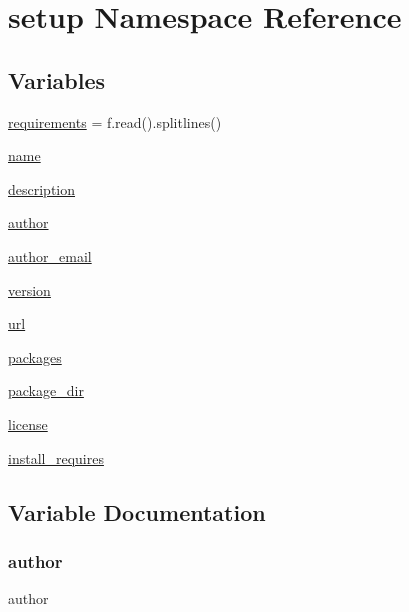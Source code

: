 \hypertarget{namespacesetup}{}\section{setup Namespace Reference}
\label{namespacesetup}
\subsection*{Variables}
\begin{DoxyCompactItemize}
\item 
\hyperlink{namespacesetup_aae5f59f06402b79899f58170ca7c3abb}{requirements} = f.\+read().splitlines()
\item 
\hyperlink{namespacesetup_ab74e6bf80237ddc4109968cedc58c151}{name}
\item 
\hyperlink{namespacesetup_a2661f439a4a94ffdcd5e47ae1da0bb1d}{description}
\item 
\hyperlink{namespacesetup_ad50afb6ec7b2501164b80a0480596ded}{author}
\item 
\hyperlink{namespacesetup_aa0684bedaf8c5c409060306e443a7742}{author\+\_\+email}
\item 
\hyperlink{namespacesetup_a4c7a521b8f1a0769c09bfa4a1fca7dab}{version}
\item 
\hyperlink{namespacesetup_afcd5a3e84f2adb7f83fa6c99911f31e4}{url}
\item 
\hyperlink{namespacesetup_a5191bfd75a28371588f75471591d5500}{packages}
\item 
\hyperlink{namespacesetup_a831b74f0aec5de1cb7b526c3de2c12ed}{package\+\_\+dir}
\item 
\hyperlink{namespacesetup_a4e659be027e258b72df12349200a263e}{license}
\item 
\hyperlink{namespacesetup_a047d4e9f7b152e767f7bd459218fe1fd}{install\+\_\+requires}
\end{DoxyCompactItemize}


\subsection{Variable Documentation}
\mbox{\label{namespacesetup_ad50afb6ec7b2501164b80a0480596ded}} 
\subsubsection{\texorpdfstring{author}{author}}
{\footnotesize\ttfamily author}

